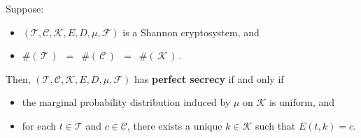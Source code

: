 \begin{theorem}[Shannon]
\mbox{}
\vskip 0.1cm
\noindent
Suppose:
\begin{itemize}
\item
	$(\mathcal{T},\mathcal{C},\mathcal{K},E,D,\mu,\mathcal{F})$
	is a Shannon cryptosystem, and
\item
	$\#\!\left(\,\mathcal{T}\,\right)$
	\,$=$\,
	$\#\!\left(\,\mathcal{C}\,\right)$
	\,$=$\,
	$\#\!\left(\,\mathcal{K}\,\right)$\,.
\end{itemize}
Then, $(\mathcal{T},\mathcal{C},\mathcal{K},E,D,\mu,\mathcal{F})$
has \textbf{perfect secrecy} if and only if
\begin{itemize}
\item
	the marginal probability distribution induced by $\mu$ on $\mathcal{K}$ is uniform, and
\item
	for each $t \in \mathcal{T}$ and $c \in \mathcal{C}$,
	there exists a unique $k \in \mathcal{K}$
	such that $E(t,k) = c$.
\end{itemize}
\end{theorem}

